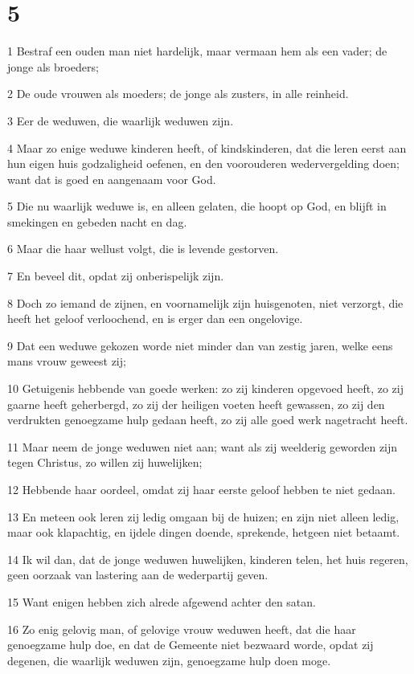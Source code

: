 \chapter{5}

\par 1 Bestraf een ouden man niet hardelijk, maar vermaan hem als een vader; de jonge als broeders;
\par 2 De oude vrouwen als moeders; de jonge als zusters, in alle reinheid.
\par 3 Eer de weduwen, die waarlijk weduwen zijn.
\par 4 Maar zo enige weduwe kinderen heeft, of kindskinderen, dat die leren eerst aan hun eigen huis godzaligheid oefenen, en den voorouderen wedervergelding doen; want dat is goed en aangenaam voor God.
\par 5 Die nu waarlijk weduwe is, en alleen gelaten, die hoopt op God, en blijft in smekingen en gebeden nacht en dag.
\par 6 Maar die haar wellust volgt, die is levende gestorven.
\par 7 En beveel dit, opdat zij onberispelijk zijn.
\par 8 Doch zo iemand de zijnen, en voornamelijk zijn huisgenoten, niet verzorgt, die heeft het geloof verloochend, en is erger dan een ongelovige.
\par 9 Dat een weduwe gekozen worde niet minder dan van zestig jaren, welke eens mans vrouw geweest zij;
\par 10 Getuigenis hebbende van goede werken: zo zij kinderen opgevoed heeft, zo zij gaarne heeft geherbergd, zo zij der heiligen voeten heeft gewassen, zo zij den verdrukten genoegzame hulp gedaan heeft, zo zij alle goed werk nagetracht heeft.
\par 11 Maar neem de jonge weduwen niet aan; want als zij weelderig geworden zijn tegen Christus, zo willen zij huwelijken;
\par 12 Hebbende haar oordeel, omdat zij haar eerste geloof hebben te niet gedaan.
\par 13 En meteen ook leren zij ledig omgaan bij de huizen; en zijn niet alleen ledig, maar ook klapachtig, en ijdele dingen doende, sprekende, hetgeen niet betaamt.
\par 14 Ik wil dan, dat de jonge weduwen huwelijken, kinderen telen, het huis regeren, geen oorzaak van lastering aan de wederpartij geven.
\par 15 Want enigen hebben zich alrede afgewend achter den satan.
\par 16 Zo enig gelovig man, of gelovige vrouw weduwen heeft, dat die haar genoegzame hulp doe, en dat de Gemeente niet bezwaard worde, opdat zij degenen, die waarlijk weduwen zijn, genoegzame hulp doen moge.

